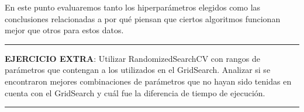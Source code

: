 \documentclass[11pt]{article}
\begin{document}
En este punto evaluaremos tanto los hiperparámetros elegidos como las
conclusiones relacionadas a por qué piensan que ciertos algoritmos
funcionan mejor que otros para estos datos.

\begin{center}\rule{0.5\linewidth}{\linethickness}\end{center}

\textbf{EJERCICIO EXTRA}: Utilizar RandomizedSearchCV con rangos de
parámetros que contengan a los utilizados en el GridSearch. Analizar si
se encontraron mejores combinaciones de parámetros que no hayan sido
tenidas en cuenta con el GridSearch y cuál fue la diferencia de tiempo
de ejecución.

\begin{center}\rule{0.5\linewidth}{\linethickness}\end{center}
\end{document}
